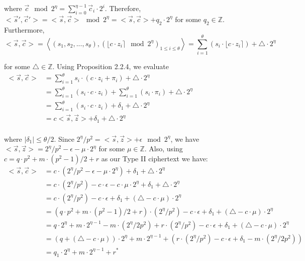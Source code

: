\documentclass[../../main.tex]{subfiles}
\begin{document}
\noindent where $\vec c \mod 2^\eta = \sum_{i=0}^{\eta-1}{\vec c_i \cdot 2^i}$. Therefore, $<\vec s', \vec c'> = <\vec s, \vec c> \mod 2^\eta = <\vec s, \vec c> + q_2 \cdot 2^\eta$ for some $q_2 \in \mathbb{Z}$. Furthermore, 
\begin{equation*}
    <\vec s, \vec c> = \left<(s_1,s_2,...,s_\theta), (\lfloor c \cdot z_i\rceil \mod 2^\eta)_{1 \leq i \leq \theta} \right> = \sum_{i=1}^{\theta}{(s_i \cdot \lfloor c \cdot z_i \rceil) + \triangle \cdot 2^\eta}
\end{equation*}

\noindent for some $\triangle \in \mathbb{Z}$. Using Proposition 2.2.4, we evaluate
\begin{equation*}
    \begin{split}
        <\vec s, \vec c> &= \sum^{\theta}_{i=1}{s_i \cdot (c \cdot z_i + \pi_i)+ \triangle \cdot 2^\eta} \qquad \qquad \qquad \qquad \qquad \qquad  \qquad \qquad \\
        &= \sum^{\theta}_{i=1}{(s_i \cdot c \cdot z_i)} + \sum^{\theta}_{i=1}{(s_i \cdot \pi_i)} + \triangle \cdot 2^\eta \\
        &= \sum^{\theta}_{i=1}{(s_i \cdot c \cdot z_i) + \delta_1 + \triangle \cdot 2^\eta} \\
        &= c <\vec s, \vec z> + \delta_1 + \triangle \cdot 2^\eta \\
    \end{split}
\end{equation*}

\noindent where $|\delta_1|\leq \theta/2$. Since $2^\eta/p^2 = <\vec s, \vec z> + \epsilon \mod 2^\eta$, we have $<\vec s, \vec z>= 2^\eta/p^2-\epsilon-\mu \cdot 2^\eta$ for some $\mu \in \mathbb{Z}$. Also, using $c=q\cdot p^2 + m \cdot (p^2-1)/2 + r$ as our Type II ciphertext we have:
\begin{equation*}
    \begin{split}
        <\vec s, \vec c> &= c \cdot (2^\eta/p^2 - \epsilon - \mu \cdot 2^\eta) + \delta_1 + \triangle \cdot 2^\eta \\
        &= c \cdot (2^\eta/p^2) - c \cdot \epsilon - c \cdot \mu \cdot 2^\eta + \delta_1 + \triangle \cdot 2^\eta \\
        &= c \cdot (2^\eta/p^2) - c \cdot \epsilon + \delta_1 + (\triangle - c \cdot \mu )\cdot 2^\eta\\
        &= (q \cdot p^2 + m \cdot (p^2-1)/2 + r) \cdot (2^\eta/p^2) - c \cdot \epsilon + \delta_1 + (\triangle - c \cdot \mu) \cdot 2^\eta \\
        &= q \cdot 2^\eta + m \cdot 2^{\eta -1} - m \cdot (2^\eta/2p^2) + r \cdot (2^\eta /p^2) - c \cdot \epsilon + \delta_1 + (\triangle - c \cdot \mu)\cdot 2^\eta \\
        &= (q + (\triangle - c \cdot \mu)) \cdot 2^\eta + m \cdot 2^{\eta - 1} + (r \cdot (2^\eta/p^2) - c \cdot \epsilon + \delta_1 - m \cdot (2^\eta/2p^2))\\
        &= q_1 \cdot 2^\eta + m \cdot 2^{\eta -1} + r^*\\
    \end{split}
\end{equation*}
\end{document}

